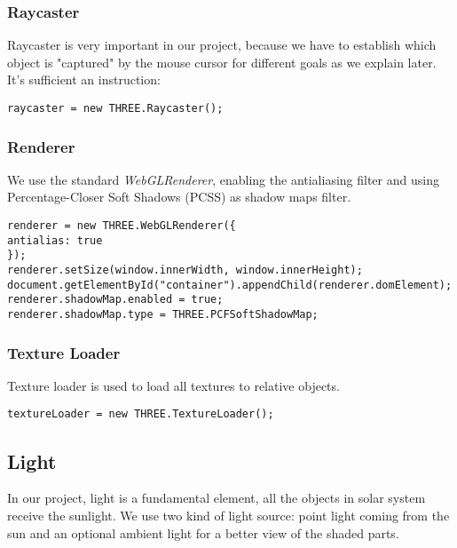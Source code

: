 \documentclass{article}
\begin{document}
\subsubsection{Raycaster}
Raycaster is very important in our project, because we have to establish which object is "captured" by the mouse cursor for different goals as we explain later\cite{documentation:threejs}. It's sufficient an instruction:
\begin{lstlisting}
raycaster = new THREE.Raycaster();
\end{lstlisting}

\subsubsection{Renderer}
We use the standard \textit{WebGLRenderer}\cite{documentation:threejs}, enabling the antialiasing filter and using Percentage-Closer Soft Shadows (PCSS) as shadow maps filter\cite{PCSS:nvidia}.
\begin{lstlisting}
renderer = new THREE.WebGLRenderer({
antialias: true
});
renderer.setSize(window.innerWidth, window.innerHeight);
document.getElementById("container").appendChild(renderer.domElement);
renderer.shadowMap.enabled = true;
renderer.shadowMap.type = THREE.PCFSoftShadowMap;
\end{lstlisting}

\subsubsection{Texture Loader}
Texture loader\cite{documentation:threejs} is used to load all textures to relative objects.
\begin{lstlisting}
textureLoader = new THREE.TextureLoader();
\end{lstlisting}


\subsection{Light}\label{light:section}
In our project, light is a fundamental element, all the objects in solar system receive the sunlight. We use two kind of light source: point light coming from the sun and an optional ambient light for a better view of the shaded parts.
\end{document}
